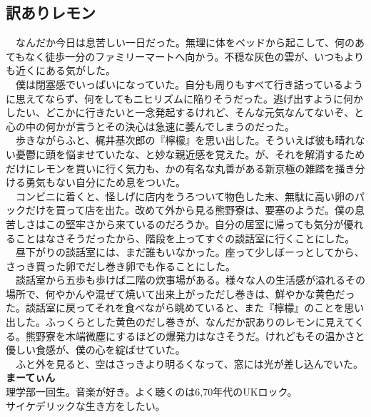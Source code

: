 \begin{myboxnote}
\subsection{訳ありレモン}
\noindent
　なんだか今日は息苦しい一日だった。無理に体をベッドから起こして、何のあてもなく徒歩一分のファミリーマートへ向かう。不穏な灰色の雲が、いつもよりも近くにある気がした。\\
　僕は閉塞感でいっぱいになっていた。自分も周りもすべて行き詰っているように思えてならず、何をしてもニヒリズムに陥りそうだった。逃げ出すように何かしたい、どこかに行きたいと一念発起するけれど、そんな元気なんてないぞ、と心の中の何かが言うとその決心は急速に萎んでしまうのだった。\\
　歩きながらふと、梶井基次郎の『檸檬』を思い出した。そういえば彼も晴れない憂鬱に頭を悩ませていたな、と妙な親近感を覚えた。が、それを解消するためだけにレモンを買いに行く気力も、かの有名な丸善がある新京極の雑踏を掻き分ける勇気もない自分にため息をついた。\\
　コンビニに着くと、怪しげに店内をうろついて物色した末、無駄に高い卵のパックだけを買って店を出た。改めて外から見る熊野寮は、要塞のようだ。僕の息苦しさはこの堅牢さから来ているのだろうか。自分の居室に帰っても気分が優れることはなさそうだったから、階段を上ってすぐの談話室に行くことにした。\\
　昼下がりの談話室には、まだ誰もいなかった。座って少しぼーっとしてから、さっき買った卵でだし巻き卵でも作ることにした。\\
　談話室から五歩も歩けば二階の炊事場がある。様々な人の生活感が溢れるその場所で、何やかんや混ぜて焼いて出来上がっただし巻きは、鮮やかな黄色だった。談話室に戻ってそれを食べながら眺めていると、また『檸檬』のことを思い出した。ふっくらとした黄色のだし巻きが、なんだか訳ありのレモンに見えてくる。熊野寮を木端微塵にするほどの爆発力はなさそうだ。けれどもその温かさと優しい食感が、僕の心を綻ばせていた。\\
　ふと外を見ると、空はさっきより明るくなって、窓には光が差し込んでいた。\\
 
\vspace{1mm}
\noindent
\textbf{まーてぃん}\\
理学部一回生。音楽が好き。よく聴くのは6,70年代のUKロック。\\
サイケデリックな生き方をしたい。

\end{myboxnote}
\vspace{1em}

